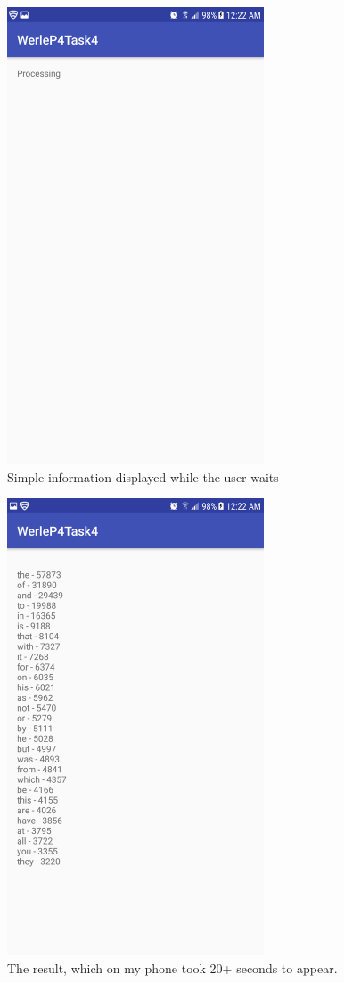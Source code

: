 \documentclass[11pt]{article}
\begin{document}
	\begin{figure}[ht]
		\includegraphics[width=3in]{img/t4s3.png}
		\centering
		\caption{Simple information displayed while the user waits}
	\end{figure}
	\begin{figure}[ht]
		\includegraphics[width=3in]{img/t4s4.png}
		\centering
		\caption{The result, which on my phone took 20+ seconds to appear.}
	\end{figure}
	
\end{document}
